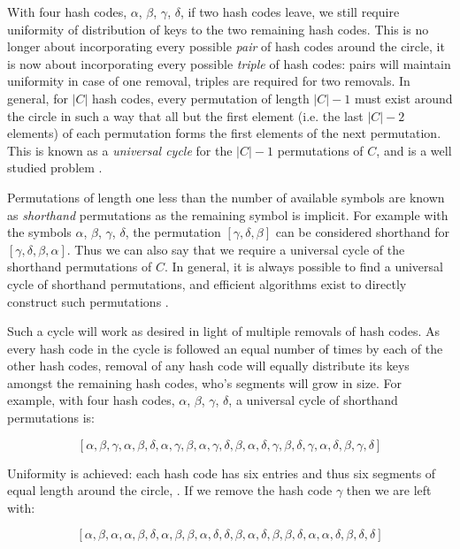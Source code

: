 \documentclass[runningheads,a4paper]{llncs}
\begin{document}
With four hash codes, $\alpha$, $\beta$, $\gamma$, $\delta$, if two
hash codes leave, we still require uniformity of distribution of keys
to the two remaining hash codes. This is no longer about incorporating
every possible {\em pair} of hash codes around the circle, it is now
about incorporating every possible {\em triple} of hash codes: pairs
will maintain uniformity in case of one removal, triples are required
for two removals. In general, for $|C|$ hash codes, every permutation
of length $|C| - 1$ must exist around the circle in such a way that
all but the first element (i.e. the last $|C| - 2$ elements) of each
permutation forms the first elements of the next permutation. This is
known as a {\em universal cycle} for the $|C| - 1$ permutations of
$C$, and is a well studied problem \cite{Jackson1993}.

Permutations of length one less than the number of available symbols
are known as {\em shorthand} permutations as the remaining symbol is
implicit. For example with the symbols $\alpha$, $\beta$, $\gamma$,
$\delta$, the permutation $[\gamma,\delta,\beta]$ can be considered
shorthand for $[\gamma,\delta,\beta,\alpha]$. Thus we can also say
that we require a universal cycle of the shorthand permutations of
$C$. In general, it is always possible to find a universal cycle of
shorthand permutations, and efficient algorithms exist to directly
construct such permutations \cite{Ruskey,Holroyd2010}.

Such a cycle will work as desired in light of multiple removals of
hash codes. As every hash code in the cycle is followed an equal
number of times by each of the other hash codes, removal of any hash
code will equally distribute its keys amongst the remaining hash
codes, who's segments will grow in size. For example, with four hash
codes, $\alpha$, $\beta$, $\gamma$, $\delta$, a universal cycle of
shorthand permutations is:

\[ [\alpha,\beta,\gamma,\alpha,\beta,\delta,\alpha,\gamma,\beta,\alpha,\gamma,\delta,\beta,\alpha,\delta,\gamma,\beta,\delta,\gamma,\alpha,\delta,\beta,\gamma,\delta] \]

\noindent
Uniformity is achieved: each hash code has six entries and thus six
segments of equal length around the circle,
. If we remove the hash code $\gamma$ then
we are left with:

\[ [\alpha,\beta,\alpha,\alpha,\beta,\delta,\alpha,\beta,\beta,\alpha,\delta,\delta,\beta,\alpha,\delta,\beta,\beta,\delta,\alpha,\alpha,\delta,\beta,\delta,\delta] \]
\end{document}
